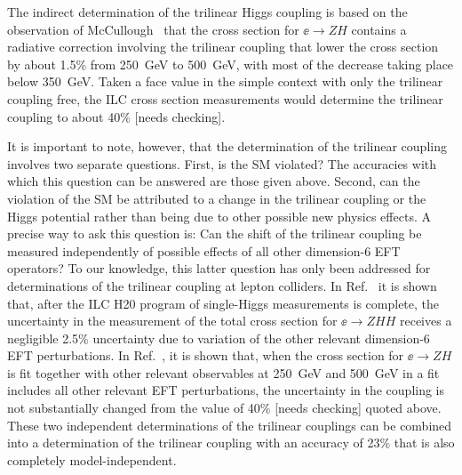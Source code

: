 The indirect determination of the trilinear Higgs coupling is based on
the observation of McCullough~\cite{McCullough:2013rea} that the cross
section for $\ee\to ZH$ contains a radiative correction involving the
trilinear coupling that lower the cross section by about 1.5\% from
250~GeV to 500~GeV, with most of the decrease taking place below
350~GeV.  Taken a face value in the simple context with only the
trilinear coupling free, the ILC cross section measurements would determine the trilinear 
coupling to about 40\% [needs checking].

It is important to note, however, that the determination of the
trilinear coupling involves two separate questions.  First, is the SM
violated?   The accuracies with which this question can be answered
are those given above.  Second, can the violation of the SM be
attributed to a change in the trilinear coupling or the Higgs
potential rather than being due to other possible new physics
effects.  A precise way to ask this question is: Can the shift of the
trilinear coupling be measured  independently of possible effects of
all 
other dimension-6 EFT operators?   To our knowledge, this latter
question has only been addressed for determinations of the trilinear
coupling at lepton colliders.   In Ref.~\cite{Barklow:2017awn} it is
shown that, after the ILC H20 program of single-Higgs measurements is
complete, the uncertainty in the measurement of the total cross
section for  $\ee\to ZHH$ receives a negligible 2.5\% uncertainty due
to variation of the other relevant dimension-6 EFT perturbations.   In
Ref.~\cite{DiVita:2017vrr}, it is shown that, when the cross section
for $\ee\to ZH$ is fit together with other relevant observables at
250~GeV and 500~GeV
in a fit includes all other relevant EFT perturbations, the
uncertainty in the coupling is not substantially changed from the value of
40\%  [needs checking] quoted above.   These two
independent determinations of the trilinear couplings can be combined
into a determination of the trilinear coupling  with an accuracy of 23\% that is
also completely model-independent.  


